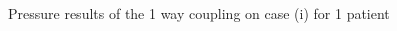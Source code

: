 \documentclass[a4paper, 11pt]{article} %
\begin{document}
\begin{figure}[hbtp]
\begin{adjustwidth}{-2cm}{}
\begin{center}
\hspace{0.05cm}
\caption{Pressure results of the 1 way coupling on case (i) for 1 patient}
\label{fig:pat_casei}
\end{center}
\end{adjustwidth}
\end{figure}
\end{document}
